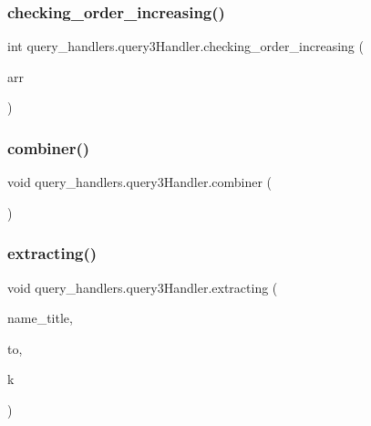 \hypertarget{classquery__handlers_1_1query3_handler_acb3ae38f189ef5a87618a1593f8af8f7}{}\label{classquery__handlers_1_1query3_handler_acb3ae38f189ef5a87618a1593f8af8f7} 
\subsubsection{\texorpdfstring{checking\+\_\+order\+\_\+increasing()}{checking\_order\_increasing()}}
{\footnotesize\ttfamily int query\+\_\+handlers.\+query3\+Handler.\+checking\+\_\+order\+\_\+increasing (\begin{DoxyParamCaption}\item[{Array\+List$<$ Integer $>$}]{arr }\end{DoxyParamCaption})}

\hypertarget{classquery__handlers_1_1query3_handler_ab800b3c663fefa2cd2a0e156c062a591}{}\label{classquery__handlers_1_1query3_handler_ab800b3c663fefa2cd2a0e156c062a591} 
\subsubsection{\texorpdfstring{combiner()}{combiner()}}
{\footnotesize\ttfamily void query\+\_\+handlers.\+query3\+Handler.\+combiner (\begin{DoxyParamCaption}{ }\end{DoxyParamCaption})}

\hypertarget{classquery__handlers_1_1query3_handler_a4e7acaec3146f3b1d3a2bb5c1f0321ff}{}\label{classquery__handlers_1_1query3_handler_a4e7acaec3146f3b1d3a2bb5c1f0321ff} 
\subsubsection{\texorpdfstring{extracting()}{extracting()}}
{\footnotesize\ttfamily void query\+\_\+handlers.\+query3\+Handler.\+extracting (\begin{DoxyParamCaption}\item[{String}]{name\+\_\+title,  }\item[{int}]{to,  }\item[{int}]{k }\end{DoxyParamCaption})}

